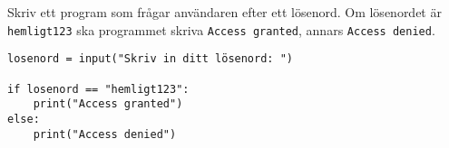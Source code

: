 \begin{exercise}
Skriv ett program som frågar användaren efter ett lösenord. Om lösenordet är \texttt{hemligt123} ska programmet skriva \texttt{Access granted}, annars \texttt{Access denied}.
\end{exercise}

\begin{solution}
\begin{lstlisting}
losenord = input("Skriv in ditt lösenord: ")

if losenord == "hemligt123":
    print("Access granted")
else:
    print("Access denied")
\end{lstlisting}
\end{solution}

